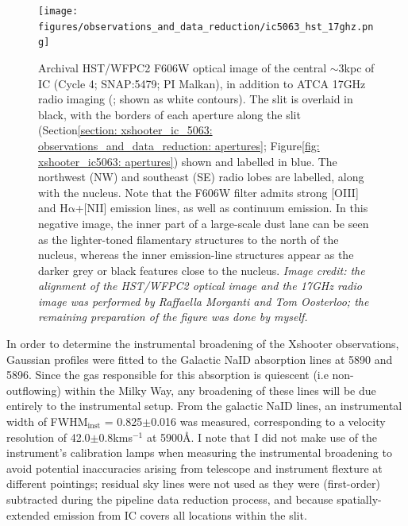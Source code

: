 \begin{figure}
    \texttt{[image: figures/observations\_and\_data\_reduction/ic5063\_hst\_17ghz.png]}
    \caption[VLT/Xshooter slit position used for the observations the Seyfert galaxy IC, overlaid on optical and 17\;GHz radio continuum imaging.]{Archival HST/WFPC2 F606W optical image of the central $\sim$3\;kpc of IC (Cycle 4; SNAP:5479; PI Malkan), in addition to ATCA 17\;GHz radio imaging (\citealt{Morganti2007}; shown as white contours). The slit is overlaid in black, with the borders of each aperture along the slit (Section\;\ref{section: xshooter_ic_5063: observations_and_data_reduction: apertures}; Figure\;\ref{fig: xshooter_ic5063: apertures}) shown and labelled in blue. The northwest (NW) and southeast (SE) radio lobes are labelled, along with the nucleus. Note that the F606W filter admits strong [OIII] and H$\mathrm{\alpha}$+[NII] emission lines, as well as continuum emission. In this negative image, the inner part of a large-scale dust lane can be seen as the lighter-toned filamentary structures to the north of the nucleus, whereas the inner emission-line structures appear as the darker grey or black features close to the nucleus. \textit{Image credit: the alignment of the HST/WFPC2 optical image and the 17\;GHz radio image was performed by Raffaella Morganti and Tom Oosterloo; the remaining preparation of the figure was done by myself.}}
    \label{fig: observations_and_data_reduction: xshooter_ic_5063: observations: ic5063_hst_17ghz}
\end{figure}

In order to determine the instrumental broadening of the Xshooter observations, Gaussian profiles were fitted to the Galactic NaID absorption lines at 5890\;{\AA} and 5896\;{\AA}. Since the gas responsible for this absorption is quiescent (i.e non-outflowing) within the Milky Way, any broadening of these lines will be due entirely to the instrumental setup. From the galactic NaID lines, an instrumental width of FWHM$_\mathrm{inst}$ = 0.825$\pm$0.016\;{\AA} was measured, corresponding to a velocity resolution of 42.0$\pm$0.8\;km\;s$^{-1}$ at 5900\;\AA. I note that I did not make use of the instrument's calibration lamps when measuring the instrumental broadening to avoid potential inaccuracies arising from telescope and instrument flexture at different pointings; residual sky lines were not used as they were (first-order) subtracted during the pipeline data reduction process, and because spatially-extended emission from IC covers all locations within the slit.

